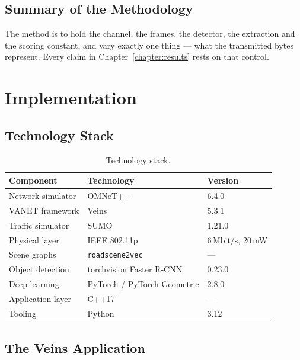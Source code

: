 \documentclass{iutbscthesis}
\begin{document}
\section{Summary of the Methodology}

The method is to hold the channel, the frames, the detector, the extraction and
the scoring constant, and vary exactly one thing --- what the transmitted bytes
represent. Every claim in Chapter~\ref{chapter:results} rests on that control.

\chapter{Implementation} \label{chapter:impl}

\section{Technology Stack}

\begin{table}[htbp]
\centering
\begin{tabular}{l l l}
\toprule
\textbf{Component} & \textbf{Technology} & \textbf{Version} \\
\midrule
Network simulator & OMNeT++ \cite{varga2008overview} & 6.4.0 \\
VANET framework & Veins \cite{sommer2011bidirectionally} & 5.3.1 \\
Traffic simulator & SUMO \cite{lopez2018microscopic} & 1.21.0 \\
Physical layer & IEEE 802.11p \cite{ieee80211p} & 6\,Mbit/s, 20\,mW \\
Scene graphs & \texttt{roadscene2vec} \cite{malawade2022roadscene2vec} & --- \\
Object detection & torchvision Faster R-CNN \cite{ren2015faster} & 0.23.0 \\
Deep learning & PyTorch / PyTorch Geometric & 2.8.0 \\
Application layer & C++17 & --- \\
Tooling & Python & 3.12 \\
\bottomrule
\end{tabular}
\caption{Technology stack.}
\label{tab:stack}
\end{table}

\section{The Veins Application}
\end{document}
